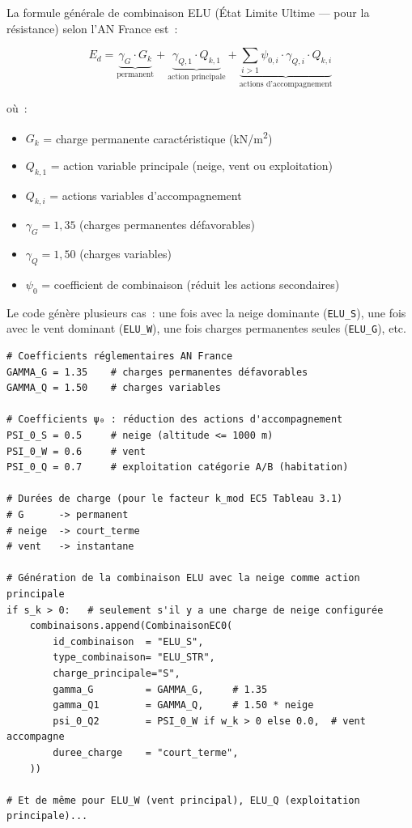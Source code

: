 \documentclass[12pt, a4paper, openany]{book}
\newcommand{\py}[1]{\texttt{#1}}
\newcommand{\fichier}[1]{\texttt{\textit{#1}}}
\begin{document}
La formule g\'en\'erale de combinaison ELU (\'Etat Limite Ultime ---
pour la r\'esistance) selon l'AN France est~:

\begin{equation}
E_{d} = \underbrace{\gamma_G \cdot G_k}_{\text{permanent}}
      + \underbrace{\gamma_{Q,1} \cdot Q_{k,1}}_{\text{action principale}}
      + \underbrace{\sum_{i>1} \psi_{0,i} \cdot \gamma_{Q,i} \cdot Q_{k,i}}_{\text{actions d'accompagnement}}
\label{eq:elu}
\end{equation}

\noindent o\`u~:
\begin{itemize}
  \item $G_k$ = charge permanente caract\'eristique (kN/m\textsuperscript{2})
  \item $Q_{k,1}$ = action variable principale (neige, vent ou exploitation)
  \item $Q_{k,i}$ = actions variables d'accompagnement
  \item $\gamma_G = 1{,}35$ (charges permanentes d\'efavorables)
  \item $\gamma_Q = 1{,}50$ (charges variables)
  \item $\psi_0$ = coefficient de combinaison (r\'eduit les actions secondaires)
\end{itemize}

Le code g\'en\`ere plusieurs cas~: une fois avec la neige dominante
(\py{ELU\_S}), une fois avec le vent dominant (\py{ELU\_W}),
une fois charges permanentes seules (\py{ELU\_G}), etc.

\begin{lstlisting}[style=python, caption={Extrait de \fichier{ec0/combinaisons.py} --- coefficients AN France et génération}]
# Coefficients réglementaires AN France
GAMMA_G = 1.35    # charges permanentes défavorables
GAMMA_Q = 1.50    # charges variables

# Coefficients ψ₀ : réduction des actions d'accompagnement
PSI_0_S = 0.5     # neige (altitude <= 1000 m)
PSI_0_W = 0.6     # vent
PSI_0_Q = 0.7     # exploitation catégorie A/B (habitation)

# Durées de charge (pour le facteur k_mod EC5 Tableau 3.1)
# G      -> permanent
# neige  -> court_terme
# vent   -> instantane

# Génération de la combinaison ELU avec la neige comme action principale
if s_k > 0:   # seulement s'il y a une charge de neige configurée
    combinaisons.append(CombinaisonEC0(
        id_combinaison  = "ELU_S",
        type_combinaison= "ELU_STR",
        charge_principale="S",
        gamma_G         = GAMMA_G,     # 1.35
        gamma_Q1        = GAMMA_Q,     # 1.50 * neige
        psi_0_Q2        = PSI_0_W if w_k > 0 else 0.0,  # vent accompagne
        duree_charge    = "court_terme",
    ))

# Et de même pour ELU_W (vent principal), ELU_Q (exploitation principale)...
\end{lstlisting}
\end{document}
